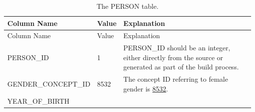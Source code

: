\documentclass[11pt]{book}
\begin{document}
\begin{longtable}[]{@{}lll@{}}
\caption{\label{tab:person} The PERSON table.}\tabularnewline
\toprule
\begin{minipage}[b]{0.33\columnwidth}\raggedright\strut
Column Name\strut
\end{minipage} & \begin{minipage}[b]{0.16\columnwidth}\raggedright\strut
Value\strut
\end{minipage} & \begin{minipage}[b]{0.42\columnwidth}\raggedright\strut
Explanation\strut
\end{minipage}\tabularnewline
\midrule
\endfirsthead
\toprule
\begin{minipage}[b]{0.33\columnwidth}\raggedright\strut
Column Name\strut
\end{minipage} & \begin{minipage}[b]{0.16\columnwidth}\raggedright\strut
Value\strut
\end{minipage} & \begin{minipage}[b]{0.42\columnwidth}\raggedright\strut
Explanation\strut
\end{minipage}\tabularnewline
\midrule
\endhead
\begin{minipage}[t]{0.33\columnwidth}\raggedright\strut
PERSON\_ID\strut
\end{minipage} & \begin{minipage}[t]{0.16\columnwidth}\raggedright\strut
1\strut
\end{minipage} & \begin{minipage}[t]{0.42\columnwidth}\raggedright\strut
PERSON\_ID should be an integer, either directly from the source or
generated as part of the build process.\strut
\end{minipage}\tabularnewline
\begin{minipage}[t]{0.33\columnwidth}\raggedright\strut
GENDER\_CONCEPT\_ID\strut
\end{minipage} & \begin{minipage}[t]{0.16\columnwidth}\raggedright\strut
8532\strut
\end{minipage} & \begin{minipage}[t]{0.42\columnwidth}\raggedright\strut
The concept ID referring to female gender is
\href{http://athena.ohdsi.org/search-terms/terms/8532}{8532}.\strut
\end{minipage}\tabularnewline
\begin{minipage}[t]{0.33\columnwidth}\raggedright\strut
YEAR\_OF\_BIRTH\strut
\end{minipage} & \begin{minipage}[t]{0.16\columnwidth}\raggedright\strut

\end{minipage}
\end{longtable}
\end{document}
